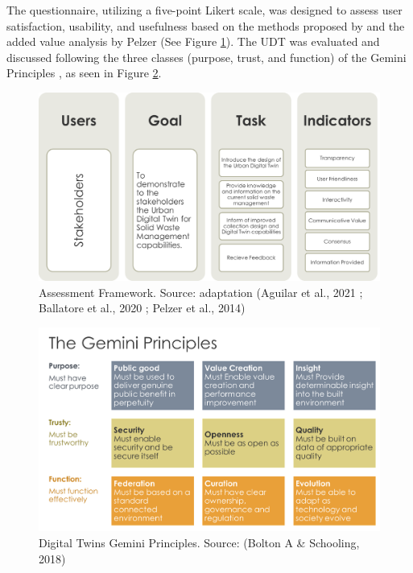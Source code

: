 \documentclass[authoryear,preprint,review,11pt,doubleblind]{elsarticle}
\begin{document}
    The questionnaire, utilizing a five-point Likert scale, was designed to assess user satisfaction, usability, and usefulness based on the methods proposed by \citet{Ballatore2020} and the added value analysis by Pelzer \citep{Pelzer2014} (See Figure \ref{fig:AssesmentFr}). The UDT was evaluated and discussed following the three classes (purpose, trust, and function) of the Gemini Principles \citep{aGeminiPrinciplesGuiding2018}, as seen in Figure \ref{fig:DTPrinciples}.

    \begin{figure}[H]    
    \centering
    \includegraphics[width=\linewidth]{Figures/AssesmentFr.png}
        \caption{Assessment Framework.
        Source: adaptation (Aguilar et al., 2021 ; Ballatore et al., 2020 ; Pelzer et al., 2014)}
        \label{fig:AssesmentFr}
    \end{figure}

    \begin{figure}[H]
    \centering
    \includegraphics[width=0.8\linewidth]{Figures/Gemini.png}
        \caption{Digital Twins Gemini Principles. Source: (Bolton A \& Schooling, 2018)}
        \label{fig:DTPrinciples}
    \end{figure}
\end{document}
